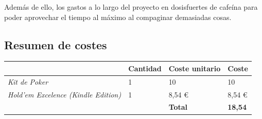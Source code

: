 Además de ello, los gastos a lo largo del proyecto en dosisfuertes de cafeína para poder aprovechar el tiempo al máximo al compaginar demasiadas cosas.



\subsection{Resumen de costes}

\begin{longtable}[c]{ll|l|l|}
\hline
\rowcolor{lightgray}\multicolumn{1}{|l|}{\textbf{Elemento}} & \textbf{Cantidad} & \textbf{Coste unitario} & \textbf{Coste} \\ \hline
\multicolumn{1}{|l|}{\textit{Kit de Poker}} & 1 & 10 & 10 \\ \hline
\multicolumn{1}{|l|}{\textit{Hold'em Excelence (Kindle Edition)}} & 1 & 8,54 € & 8,54 € \\ \hline
 &  & \textbf{Total} & \textbf{18,54} \\ \cline{3-4} 

\end{longtable}